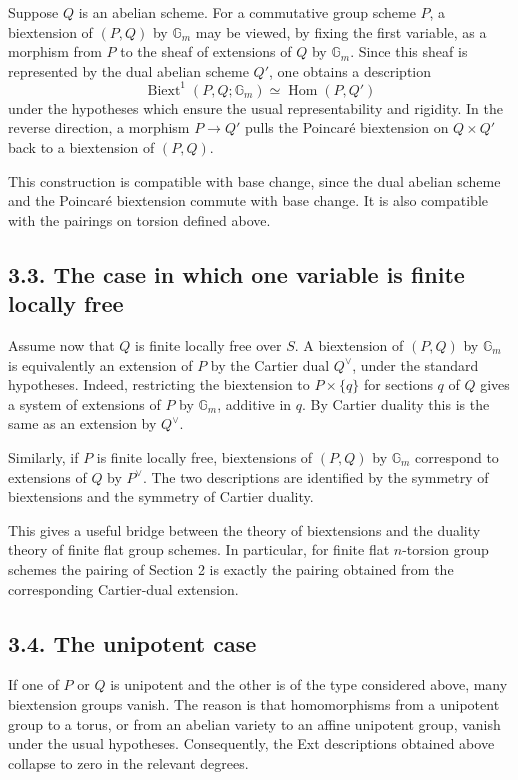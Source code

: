 \documentclass[11pt]{article}
\newcommand{\Gm}{\mathbb G_m}
\newcommand{\Hom}{\operatorname{Hom}}
\newcommand{\Biext}{\operatorname{Biext}}
\begin{document}
Suppose \(Q\) is an abelian scheme. For a commutative group scheme \(P\), a
biextension of \((P,Q)\) by \(\Gm\) may be viewed, by fixing the first variable,
as a morphism from \(P\) to the sheaf of extensions of \(Q\) by \(\Gm\). Since
this sheaf is represented by the dual abelian scheme \(Q'\), one obtains a
description
\[
\Biext^1(P,Q;\Gm)\simeq \Hom(P,Q')
\]
under the hypotheses which ensure the usual representability and rigidity. In
the reverse direction, a morphism \(P\to Q'\) pulls the Poincaré biextension on
\(Q\times Q'\) back to a biextension of \((P,Q)\).

This construction is compatible with base change, since the dual abelian scheme
and the Poincaré biextension commute with base change. It is also compatible with
the pairings on torsion defined above.

\subsection*{3.3. The case in which one variable is finite locally free}

Assume now that \(Q\) is finite locally free over \(S\). A biextension of
\((P,Q)\) by \(\Gm\) is equivalently an extension of \(P\) by the Cartier dual
\(Q^\vee\), under the standard hypotheses. Indeed, restricting the biextension to
\(P\times \{q\}\) for sections \(q\) of \(Q\) gives a system of extensions of
\(P\) by \(\Gm\), additive in \(q\). By Cartier duality this is the same as an
extension by \(Q^\vee\).

Similarly, if \(P\) is finite locally free, biextensions of \((P,Q)\) by
\(\Gm\) correspond to extensions of \(Q\) by \(P^\vee\). The two descriptions are
identified by the symmetry of biextensions and the symmetry of Cartier duality.

This gives a useful bridge between the theory of biextensions and the duality
theory of finite flat group schemes. In particular, for finite flat
\(n\)-torsion group schemes the pairing of Section 2 is exactly the pairing
obtained from the corresponding Cartier-dual extension.

\subsection*{3.4. The unipotent case}

If one of \(P\) or \(Q\) is unipotent and the other is of the type considered
above, many biextension groups vanish. The reason is that homomorphisms from a
unipotent group to a torus, or from an abelian variety to an affine unipotent
group, vanish under the usual hypotheses. Consequently, the Ext descriptions
obtained above collapse to zero in the relevant degrees.
\end{document}

